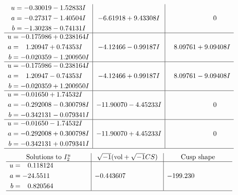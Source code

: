 \documentclass[1p]{elsarticle_modified}
\theoremstyle{definition}
\newcommand{\I}{\sqrt{-1}}
\begin{document}
$$\begin{array}{c|c|c}
\begin{aligned}
u &= -0.30019 - 1.52833 I \\
a &= -0.27317 - 1.40504 I \\
b &= -1.30238 - 0.74131 I\end{aligned}
 & -6.61918 + 9.43308 I & \phantom{-0.000000 } 0 \\ \hline\begin{aligned}
u &= -0.175986 + 0.238164 I \\
a &= \phantom{-}1.20947 + 0.74353 I \\
b &= -0.020359 - 1.200950 I\end{aligned}
 & -4.12466 - 0.99187 I & \phantom{-}8.09761 + 9.09408 I \\ \hline\begin{aligned}
u &= -0.175986 - 0.238164 I \\
a &= \phantom{-}1.20947 - 0.74353 I \\
b &= -0.020359 + 1.200950 I\end{aligned}
 & -4.12466 + 0.99187 I & \phantom{-}8.09761 - 9.09408 I \\ \hline\begin{aligned}
u &= -0.01650 + 1.74532 I \\
a &= -0.292008 - 0.300798 I \\
b &= -0.342131 - 0.079341 I\end{aligned}
 & -11.90070 - 4.45233 I & \phantom{-0.000000 } 0 \\ \hline\begin{aligned}
u &= -0.01650 - 1.74532 I \\
a &= -0.292008 + 0.300798 I \\
b &= -0.342131 + 0.079341 I\end{aligned}
 & -11.90070 + 4.45233 I & \phantom{-0.000000 } 0\\
 \hline 
 \end{array}$$\newpage$$\begin{array}{c|c|c}  
\text{Solutions to }I^u_{2}& \I (\text{vol} + \sqrt{-1}CS) & \text{Cusp shape}\\
 \hline 
\begin{aligned}
u &= \phantom{-}0.118124\phantom{ +0.000000I} \\
a &= -24.5511\phantom{ +0.000000I} \\
b &= \phantom{-}0.820564\phantom{ +0.000000I}\end{aligned}
 & -0.443607\phantom{ +0.000000I} & -199.230\phantom{ +0.000000I}\\
 \hline 
 \end{array}$$\newpage\newpage\renewcommand{\arraystretch}{1}
\end{document}
